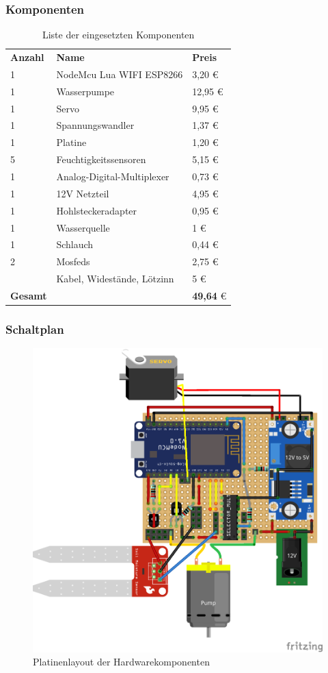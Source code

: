     \subsubsection{Komponenten}
    \begin{table}[H]
        \begin{tabular}{lll}
            \textbf{Anzahl} & \textbf{Name} & \textbf{Preis} \\
            1 & NodeMcu Lua WIFI ESP8266 & 3,20 \euro \\
            1 & Wasserpumpe & 12,95 \euro \\
            1 & Servo & 9,95 \euro \\
            1 & Spannungswandler & 1,37 \euro \\
            1 & Platine & 1,20 \euro \\
            5 & Feuchtigkeitssensoren & 5,15 \euro \\
            1 & Analog-Digital-Multiplexer & 0,73 \euro \\
            1 & 12V Netzteil & 4,95 \euro \\
            1 & Hohlsteckeradapter & 0,95 \euro \\
            1 & Wasserquelle & 1 \euro \\
            1 & Schlauch & 0,44 \euro \\
            2 & Mosfeds & 2,75 \euro \\
            & Kabel, Widestände, Lötzinn & 5 \euro \\
            \textbf{Gesamt} &  & \textbf{49,64} \euro
        \end{tabular}
        \caption{Liste der eingesetzten Komponenten}
    \end{table}
    \subsubsection{Schaltplan}
    \begin{figure}[H]
        \centering
        \includegraphics[width=0.8\linewidth]{Pictures/platinenlayout}
        \caption{Platinenlayout der Hardwarekomponenten}
        \label{fig:platinenlayout}
    \end{figure}
